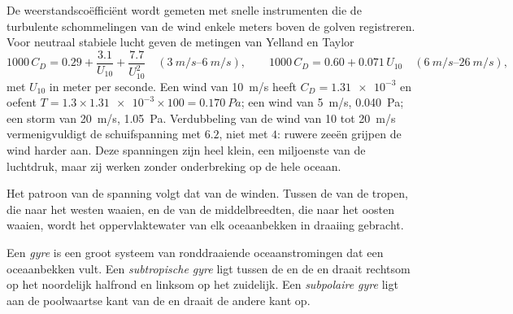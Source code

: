 De weerstandscoëfficiënt wordt gemeten met snelle instrumenten die de turbulente schommelingen van de wind enkele meters boven de golven registreren. Voor neutraal stabiele lucht geven de metingen van Yelland en Taylor
\[
  1000\,C_D = 0.29 + \frac{3.1}{U_{10}} + \frac{7.7}{U_{10}^2}
  \quad (\qtyrange{3}{6}{m/s}),
  \qquad
  1000\,C_D = 0.60 + 0.071\,U_{10}
  \quad (\qtyrange{6}{26}{m/s}),
\]
met $U_{10}$ in meter per seconde. Een wind van \qty{10}{m/s} heeft $C_D =
\num{1.31e-3}$ en oefent $T = 1.3 \times \num{1.31e-3} \times 100 =
\qty{0.170}{Pa}$; een wind van \qty{5}{m/s}, \qty{0.040}{Pa}; een storm van
\qty{20}{m/s}, \qty{1.05}{Pa}. Verdubbeling van de wind van 10 tot \qty{20}{m/s}
vermenigvuldigt de schuifspanning met $6.2$, niet met $4$: ruwere zeeën grijpen de wind harder aan. Deze spanningen zijn heel klein, een miljoenste van de luchtdruk, maar zij werken zonder onderbreking op de hele oceaan.

Het patroon van de spanning volgt dat van de winden. Tussen de  van de tropen, die naar het westen waaien, en de  van de middelbreedten, die naar het oosten waaien, wordt het oppervlaktewater van elk oceaanbekken in draaiing gebracht.

\begin{definition}\label{def:b1:ocean-circulation:gyre}
Een \emph{gyre} is een groot systeem van ronddraaiende oceaanstromingen dat een oceaanbekken vult. Een \emph{subtropische gyre} ligt tussen de  en de  en draait rechtsom op het noordelijk halfrond en linksom op het zuidelijk. Een \emph{subpolaire gyre} ligt aan de poolwaartse kant van de  en draait de andere kant op.
\end{definition}


